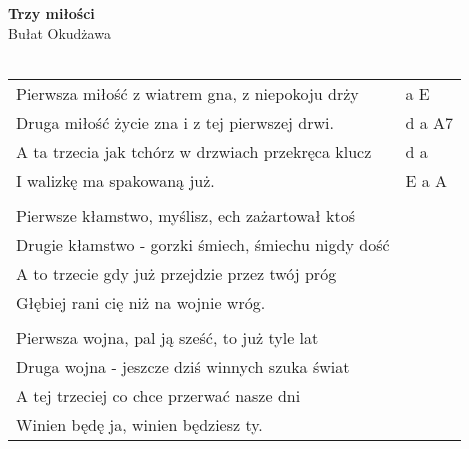 \documentclass[a5paper]{article}
\begin{document}


\noindent
\fontsize{12pt}{15pt}\selectfont
\textbf{Trzy miłości} \\
\fontsize{8pt}{10pt}\selectfont
Bułat Okudżawa \\ \\
\fontsize{10pt}{12pt}\selectfont
{}
\begin{tabular}{@{}p{8.50cm}p{3cm}@{}}
\noindent
Pierwsza miłość z wiatrem gna, z niepokoju drży & a E \\
Druga miłość życie zna i z tej pierwszej drwi. & d a A7 \\
A ta trzecia jak tchórz w drzwiach przekręca klucz & d a \\
I walizkę ma spakowaną już. & E a A \\ \\

Pierwsze kłamstwo, myślisz, ech zażartował ktoś\\
Drugie kłamstwo - gorzki śmiech, śmiechu nigdy dość\\
A to trzecie gdy już przejdzie przez twój próg\\
Głębiej rani cię niż na wojnie wróg.\\ \\

Pierwsza wojna, pal ją sześć, to już tyle lat\\
Druga wojna - jeszcze dziś winnych szuka świat\\
A tej trzeciej co chce przerwać nasze dni\\
Winien będę ja, winien będziesz ty.
\end{tabular}
\end{document}
